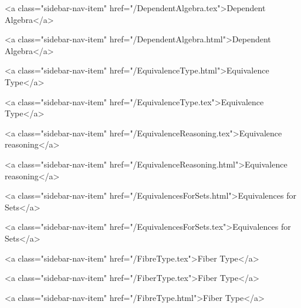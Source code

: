      
    
      
        
          <a class="sidebar-nav-item" href="/DependentAlgebra.tex">Dependent Algebra</a>
        
      
    
      
        
          <a class="sidebar-nav-item" href="/DependentAlgebra.html">Dependent Algebra</a>
        
      
    
      
        
          <a class="sidebar-nav-item" href="/EquivalenceType.html">Equivalence Type</a>
        
      
    
      
        
          <a class="sidebar-nav-item" href="/EquivalenceType.tex">Equivalence Type</a>
        
      
    
      
        
          <a class="sidebar-nav-item" href="/EquivalenceReasoning.tex">Equivalence reasoning</a>
        
      
    
      
        
          <a class="sidebar-nav-item" href="/EquivalenceReasoning.html">Equivalence reasoning</a>
        
      
    
      
        
          <a class="sidebar-nav-item" href="/EquivalencesForSets.html">Equivalences for Sets</a>
        
      
    
      
        
          <a class="sidebar-nav-item" href="/EquivalencesForSets.tex">Equivalences for Sets</a>
        
      
    
      
        
          <a class="sidebar-nav-item" href="/FibreType.tex">Fiber Type</a>
        
      
    
      
        
          <a class="sidebar-nav-item" href="/FiberType.tex">Fiber Type</a>
        
      
    
      
        
          <a class="sidebar-nav-item" href="/FibreType.html">Fiber Type</a>
        
